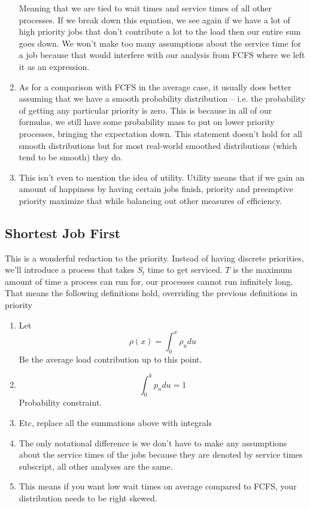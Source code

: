 \begin{enumerate}
  Meaning that we are tied to wait times and service times of all other processes.
  If we break down this equation, we see again if we have a lot of high priority jobs that don't contribute a lot to the load then our entire sum goes down.
  We won't make too many assumptions about the service time for a job because that would interfere with our analysis from FCFS where we left it as an expression.

  \item As for a comparison with FCFS in the average case, it usually does better assuming that we have a smooth probability distribution -- i.e. the probability of getting any particular priority is zero.
  This is because in all of our formulas, we still have some probability mass to put on lower priority processes, bringing the expectation down.
  This statement doesn't hold for all smooth distributions but for most real-world smoothed distributions (which tend to be smooth) they do.

\item This isn't even to mention the idea of utility.
  Utility means that if we gain an amount of happiness by having certain jobs finish, priority and preemptive priority maximize that while balancing out other measures of efficiency.
\end{enumerate}


\subsection{Shortest Job First}
This is a wonderful reduction to the priority.
Instead of having discrete priorities, we'll introduce a process that takes $S_t$ time to get serviced.
$T$ is the maximum amount of time a process can run for, our processes cannot run infinitely long.
That means the following definitions hold, overriding the previous definitions in priority

\begin{enumerate}
\item Let
  \[
  \rho(x) = \int_0^x \rho_u du
  \]
  Be the average load contribution up to this point.
\item
  \[
  \int_0^k p_u du = 1
  \] Probability constraint.
\item Etc, replace all the summations above with integrals
\item The only notational difference is we don't have to make any assumptions about the service times of the jobs because they are denoted by service times subscript, all other analyses are the same.
  \item This means if you want low wait times on average compared to FCFS, your distribution needs to be right skewed.
\end{enumerate}

